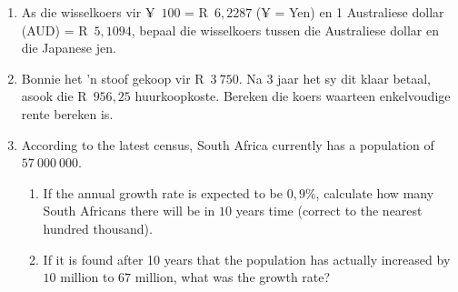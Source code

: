 \begin{eocexercises}{}
\begin{enumerate}[label=\textbf{\arabic*}.]
	\item As die wisselkoers vir ¥~$100$ = R~$6,2287$ (¥ = Yen) en 1 Australiese dollar (AUD) = R~$5,1094$, bepaal die wisselkoers
tussen die Australiese dollar en die Japanese jen.
	\item Bonnie het ’n stoof gekoop vir R~$3~750$. Na 3 jaar het sy dit klaar betaal, asook die R~$956,25$ huurkoopkoste.
Bereken die koers waarteen enkelvoudige rente bereken is.
	\item According to the latest census, South Africa currently has a population of $57~000~000$.
	\begin{enumerate}[noitemsep, label=\textbf{(\alph*)} ]
	    \item If the annual growth rate is expected to be $0,9\%$, calculate how many South Africans there will be in $10$ years time (correct to the nearest hundred thousand).

	    \item If it is found after 10 years that the population has actually increased by $10$ million to $67$ million, what was the growth rate?
	\end{enumerate}
    \end{enumerate}
\end{eocexercises}



